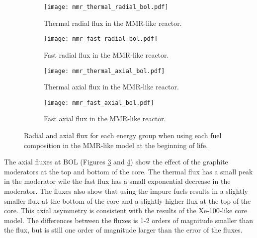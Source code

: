 \begin{figure}[h!]
        \centering
        \begin{subfigure}[b]{0.48\textwidth}
            \centering
            \texttt{[image: mmr\_thermal\_radial\_bol.pdf]}
            \caption{Thermal radial flux in the \gls{MMR}-like reactor.}
            \label{fig:mmr_thermal_radial_bol}
        \end{subfigure}
        \hfill
        \begin{subfigure}[b]{0.48\textwidth}
            \centering
            \texttt{[image: mmr\_fast\_radial\_bol.pdf]}
            \caption{Fast radial flux in the \gls{MMR}-like reactor.}
            \label{fig:mmr_fast_radial_bol}
        \end{subfigure}
        \hfill            
        \begin{subfigure}[b]{0.48\textwidth}
            \centering
            \texttt{[image: mmr\_thermal\_axial\_bol.pdf]}
            \caption{Thermal axial flux in the \gls{MMR}-like reactor. }
            \label{fig:mmr_thermal_axial_bol}
        \end{subfigure}
        \hfill
        \begin{subfigure}[b]{0.48\textwidth}
            \centering
            \texttt{[image: mmr\_fast\_axial\_bol.pdf]}
            \caption{Fast axial flux in the \gls{MMR}-like reactor.}
            \label{fig:mmr_fast_axial_bol}
        \end{subfigure}
        \hfill
        \caption{Radial and axial flux for each energy group when using 
        each fuel composition in the \gls{MMR}-like model at the beginning 
        of life.}
        \label{fig:mmr_bol}
   \end{figure}

The axial fluxes at \gls{BOL} (Figures \ref{fig:mmr_thermal_axial_bol} and 
\ref{fig:mmr_fast_axial_bol}) show the effect of the graphite moderators at 
the top and bottom of the core. The thermal flux has a small peak in the 
moderator wile the fast flux has a small exponential decrease in the 
moderator. The fluxes also show that using the impure fuels results in 
a slightly smaller flux at the bottom of the core and a slightly higher 
flux at the top of the core. This axial asymmetry is consistent with 
the results of the Xe-100-like core model. The differences between the 
fluxes is 1-2 orders of magnitude smaller than the flux, but is 
still one order of magnitude larger than the error of the fluxes.

